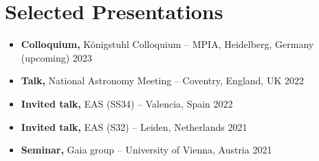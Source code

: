 \section*{Selected Presentations}

\begin{itemize}
    \item \textbf{Colloquium,} Königstuhl Colloquium -- MPIA, Heidelberg, Germany \hfill (upcoming) 2023
    \item \textbf{Talk,} National Astronomy Meeting -- Coventry, England, UK \hfill 2022
    \item \textbf{Invited talk,} EAS (SS34) -- Valencia, Spain \hfill 2022
    \item \textbf{Invited talk,} EAS (S32) -- Leiden, Netherlands \hfill 2021
    \item \textbf{Seminar,} Gaia group -- University of Vienna, Austria \hfill 2021
\end{itemize}